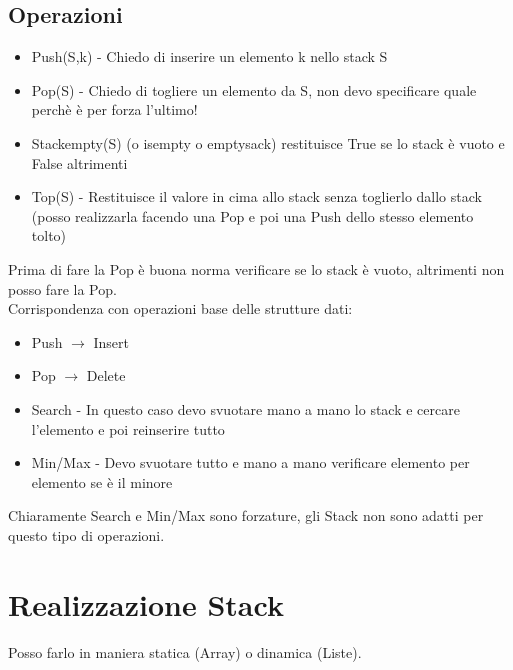 \subsection{Operazioni}
\begin{itemize}
    \item Push(S,k) - Chiedo di inserire un elemento k nello stack S
    \item Pop(S) - Chiedo di togliere un elemento da S, non devo specificare quale perchè è per forza l'ultimo!
    \item Stackempty(S) (o isempty o emptysack) restituisce True se lo stack è vuoto e False altrimenti
    \item Top(S) - Restituisce il valore in cima allo stack senza toglierlo dallo stack (posso realizzarla facendo
    una Pop e poi una Push dello stesso elemento tolto)
\end{itemize}
Prima di fare la Pop è buona norma verificare se lo stack è vuoto, altrimenti non posso fare la Pop.\\
Corrispondenza con operazioni base delle strutture dati:
\begin{itemize}
    \item Push $\rightarrow$ Insert
    \item Pop $\rightarrow$ Delete
    \item Search - In questo caso devo svuotare mano a mano lo stack e cercare l'elemento e poi reinserire tutto
    \item Min/Max - Devo svuotare tutto e mano a mano verificare elemento per elemento se è il minore
\end{itemize}
Chiaramente Search e Min/Max sono forzature, gli Stack non sono adatti per questo tipo di operazioni.\\
\section{Realizzazione Stack}
Posso farlo in maniera statica (Array) o dinamica (Liste).
